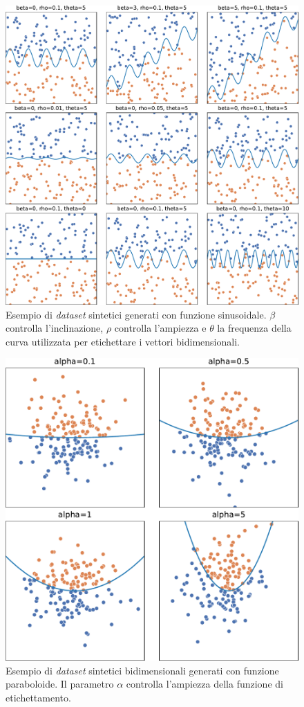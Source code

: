 \begin{figure}
    \centering
    \includegraphics[width=\linewidth]{img/sinusoid_dataset_param_influence.pdf}
    \caption[Esempio di \emph{dataset} sintetici generati con funzione sinusoidale.]{Esempio di \emph{dataset} sintetici generati con funzione sinusoidale. 
    $\beta$ controlla l'inclinazione, $\rho$ controlla l'ampiezza e $\theta$ la frequenza della curva utilizzata per etichettare i vettori bidimensionali.}
    \label{fig:sinusoid_dataset}
\end{figure}
\begin{figure}
    \centering
    \includegraphics[width=.7\linewidth]{img/pacman_dataset_param_influence.pdf}
    \caption[Esempio di \emph{dataset} sintetici bidimensionali generati con funzione paraboloide.]{Esempio di \emph{dataset} sintetici bidimensionali generati con funzione paraboloide. Il parametro $\alpha$ controlla l'ampiezza della funzione di etichettamento.}
    \label{fig:pacman_dataset}
\end{figure}
